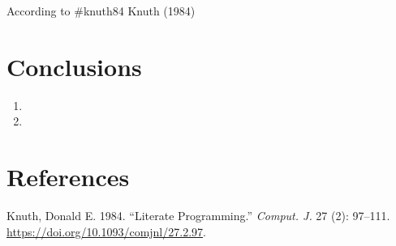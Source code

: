 \documentclass[
  letterpaper,
  DIV=11,
  numbers=noendperiod,
  oneside]{scrreprt}
\providecommand{\tightlist}{%
  \setlength{\itemsep}{0pt}\setlength{\parskip}{0pt}}\usepackage{longtable,booktabs,array}
\newlength{\cslhangindent}
\newlength{\cslentryspacingunit} %
\newenvironment{CSLReferences}[2] %
 {%
  \setlength{\parindent}{0pt}
  \ifodd #1
  \let\oldpar\par
  \def\par{\hangindent=\cslhangindent\oldpar}
  \fi
  \setlength{\parskip}{#2\cslentryspacingunit}
 }%
 {}
\begin{document}
According to \#knuth84 Knuth (1984)


\hypertarget{conclusions}{%
\chapter{Conclusions}\label{conclusions}}

\begin{enumerate}
\def\labelenumi{\arabic{enumi}.}
\tightlist
\item
\item
\end{enumerate}


\hypertarget{references}{%
\chapter*{References}\label{references}}


\hypertarget{refs}{}
\begin{CSLReferences}{1}{0}
\leavevmode{}%
Knuth, Donald E. 1984. {``Literate Programming.''} \emph{Comput. J.} 27
(2): 97--111. \url{https://doi.org/10.1093/comjnl/27.2.97}.

\end{CSLReferences}
\end{document}
